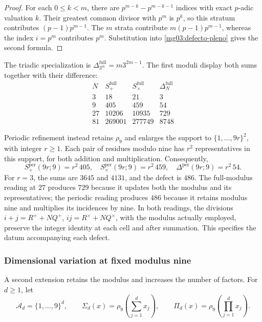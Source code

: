\begin{proof}
For each \(0\leq k<m\), there are
\(p^{m-k}-p^{m-k-1}\) indices with exact \(p\)-adic valuation
\(k\). Their greatest common divisor with \(p^m\) is \(p^k\),
so this stratum contributes \((p-1)p^{m-1}\). The \(m\) strata
contribute \(m(p-1)p^{m-1}\), whereas the index \(i=p^m\)
contributes \(p^m\). Substitution into \eqref{mg03:defecto-pleno}
gives the second formula.
\end{proof}

The triadic specialization is
\(\Delta_{3^m}^{\mathrm{full}}=m3^{2m-1}\). The first moduli
display both sums together with their difference:
\[
\begin{array}{c|r|r|r}
 N&S_+^{\mathrm{full}}&S_\times^{\mathrm{full}}&\Delta_N^{\mathrm{full}}\\\hline
 3&18&21&3\\
 9&405&459&54\\
 27&10206&10935&729\\
 81&269001&277749&8748
\end{array}
\]

Periodic refinement instead retains \(\rho_9\) and enlarges the
support to \(\{1,\ldots,9r\}^2\), with integer \(r\geq1\). Each pair of residues modulo
nine has \(r^2\) representatives in this support, for both addition
and multiplication. Consequently,
\begin{equation}
 S_+^{\mathrm{per}}(9r;9)=r^2\,405,\quad
 S_\times^{\mathrm{per}}(9r;9)=r^2\,459,\quad
 \Delta^{\mathrm{per}}(9r;9)=r^2\,54.
 \label{mg03:periodico}
\end{equation}
For \(r=3\), the sums are \(3645\) and \(4131\), and the defect
is \(486\). The full-modulus reading at \(27\) produces \(729\)
because it updates both the modulus and its representatives; the periodic
reading produces \(486\) because it retains modulus nine and multiplies
its incidences by nine. In both readings, the divisions
\(i+j=R^++NQ^+\), \(ij=R^\times+NQ^\times\), with the modulus
actually employed, preserve the integer identity at each cell and after
summation. This specifies the datum accompanying each defect.

\subsubsection{Dimensional variation at fixed modulus nine}
\label{mg03:dimension}

A second extension retains the modulus and increases the number of
factors. For \(d\geq1\), let
\[
 \mathcal A_d=\{1,\ldots,9\}^d,\qquad
 \Sigma_d(x)=\rho_9\!\left(\sum_{j=1}^d x_j\right),\qquad
 \Pi_d(x)=\rho_9\!\left(\prod_{j=1}^d x_j\right).
\]

